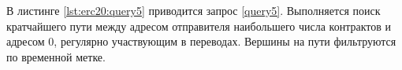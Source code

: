 В листинге \ref{lst:erc20:query5} приводится запрос \ref{query5}. Выполняется поиск кратчайшего пути между адресом
отправителя наибольшего числа контрактов и адресом 0, регулярно участвующим в переводах. Вершины на пути фильтруются
по временной метке.

